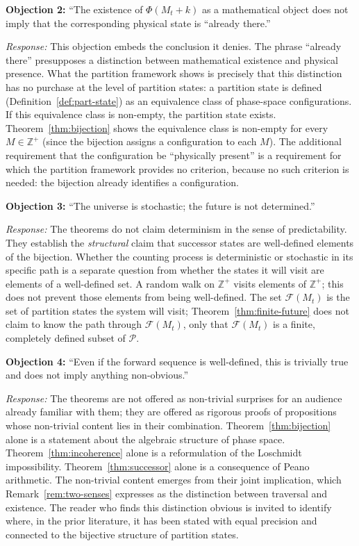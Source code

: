 \documentclass[twocolumn,10pt,a4paper]{article}
\theoremstyle{thmstyle}
\theoremstyle{definition}
\theoremstyle{remark}
\newcommand{\Zp}{\mathbb{Z}^{+}}
\newcommand{\Parts}{\mathcal{P}}
\newcommand{\PhiMap}{\varPhi}
\begin{document}
\textbf{Objection 2:} ``The existence of $\PhiMap(M_t + k)$ as a mathematical object does not imply that the corresponding physical state is ``already there.''

\textit{Response:} This objection embeds the conclusion it denies. The phrase ``already there'' presupposes a distinction between mathematical existence and physical presence. What the partition framework shows is precisely that this distinction has no purchase at the level of partition states: a partition state is defined (Definition~\ref{def:part-state}) as an equivalence class of phase-space configurations. If this equivalence class is non-empty, the partition state exists. Theorem~\ref{thm:bijection} shows the equivalence class is non-empty for every $M \in \Zp$ (since the bijection assigns a configuration to each $M$). The additional requirement that the configuration be ``physically present'' is a requirement for which the partition framework provides no criterion, because no such criterion is needed: the bijection already identifies a configuration.

\textbf{Objection 3:} ``The universe is stochastic; the future is not determined.''

\textit{Response:} The theorems do not claim determinism in the sense of predictability. They establish the \emph{structural} claim that successor states are well-defined elements of the bijection. Whether the counting process is deterministic or stochastic in its specific path is a separate question from whether the states it will visit are elements of a well-defined set. A random walk on $\Zp$ visits elements of $\Zp$; this does not prevent those elements from being well-defined. The set $\mathcal{F}(M_t)$ is the set of partition states the system will visit; Theorem~\ref{thm:finite-future} does not claim to know the path through $\mathcal{F}(M_t)$, only that $\mathcal{F}(M_t)$ is a finite, completely defined subset of $\Parts$.

\textbf{Objection 4:} ``Even if the forward sequence is well-defined, this is trivially true and does not imply anything non-obvious.''

\textit{Response:} The theorems are not offered as non-trivial surprises for an audience already familiar with them; they are offered as rigorous proofs of propositions whose non-trivial content lies in their combination. Theorem~\ref{thm:bijection} alone is a statement about the algebraic structure of phase space. Theorem~\ref{thm:incoherence} alone is a reformulation of the Loschmidt impossibility. Theorem~\ref{thm:successor} alone is a consequence of Peano arithmetic. The non-trivial content emerges from their joint implication, which Remark~\ref{rem:two-senses} expresses as the distinction between traversal and existence. The reader who finds this distinction obvious is invited to identify where, in the prior literature, it has been stated with equal precision and connected to the bijective structure of partition states.
\end{document}
